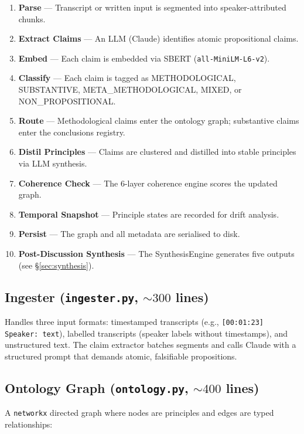 \documentclass[11pt,letterpaper]{article}
\begin{document}
\begin{enumerate}
\item \textbf{Parse} --- Transcript or written input is segmented into speaker-attributed chunks.
\item \textbf{Extract Claims} --- An LLM (Claude) identifies atomic propositional claims.
\item \textbf{Embed} --- Each claim is embedded via SBERT (\texttt{all-MiniLM-L6-v2}).
\item \textbf{Classify} --- Each claim is tagged as METHODOLOGICAL, SUBSTANTIVE, META\_METHODOLOGICAL, MIXED, or NON\_PROPOSITIONAL.
\item \textbf{Route} --- Methodological claims enter the ontology graph; substantive claims enter the conclusions registry.
\item \textbf{Distil Principles} --- Claims are clustered and distilled into stable principles via LLM synthesis.
\item \textbf{Coherence Check} --- The 6-layer coherence engine scores the updated graph.
\item \textbf{Temporal Snapshot} --- Principle states are recorded for drift analysis.
\item \textbf{Persist} --- The graph and all metadata are serialised to disk.
\item \textbf{Post-Discussion Synthesis} --- The SynthesisEngine generates five outputs (see \S\ref{sec:synthesis}).
\end{enumerate}

\subsection{Ingester (\texttt{ingester.py}, ${\sim}300$ lines)}

Handles three input formats: timestamped transcripts (e.g., \texttt{[00:01:23] Speaker: text}), labelled transcripts (speaker labels without timestamps), and unstructured text. The claim extractor batches segments and calls Claude with a structured prompt that demands atomic, falsifiable propositions.

\subsection{Ontology Graph (\texttt{ontology.py}, ${\sim}400$ lines)}

A \texttt{networkx} directed graph where nodes are principles and edges are typed relationships:

\begin{center}
\end{center}
\end{document}
